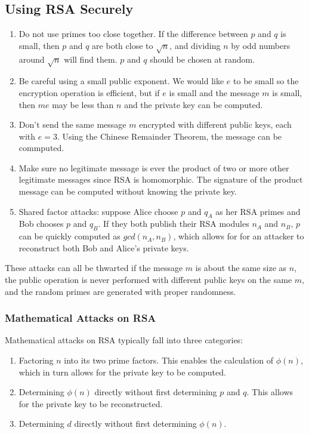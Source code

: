 \documentclass{math}
\begin{document}
\subsection*{Using RSA Securely}
\begin{enumerate}
  \item Do not use primes too close together. If the difference between \( p \)
  and \( q \) is small, then \( p \) and \( q \) are both close to
  \( \sqrt{n} \), and dividing \( n \) by odd numbers around \( \sqrt{n} \) will
  find them. \( p \) and \( q \) should be chosen at random.
  \item Be careful using a small public exponent. We would like \( e \) to be
  small so the encryption operation is efficient, but if \( e \) is small and
  the message \( m \) is small, then \( me \) may be less than \( n \) and
  the private key can be computed.
  \item Don't send the same message \( m \) encrypted with different public
  keys, each with \( e = 3 \). Using the Chinese Remainder Theorem, the
  message can be commputed.
  \item Make sure no legitimate message is ever the product of two or more
  other legitimate messages since RSA is homomorphic. The signature of the
  product message can be computed without knowing the private key.
  \item Shared factor attacks: suppose Alice choose \( p \) and \( q_A \) as
  her RSA primes and Bob chooses \( p \) and \( q_B \). If they both publish
  their RSA modules \( n_A \) and \( n_B \), \( p \) can be quickly computed
  as \( gcd(n_A, n_B) \), which allows for for an attacker to reconstruct
  both Bob and Alice's private keys.
\end{enumerate}
These attacks can all be thwarted if the message \( m \) is about the same
size as \( n \), the public operation is never performed with different public
keys on the same \( m \), and the random primes are generated with proper
randomness.

\subsubsection*{Mathematical Attacks on RSA}
Mathematical attacks on RSA typically fall into three categories:
\begin{enumerate}
  \item Factoring \( n \) into its two prime factors. This enables the
  calculation of \( \phi(n) \), which in turn allows for the private key to be
  computed.
  \item Determining \( \phi(n) \) directly without first determining \( p \) and
  \( q \). This allows for the private key to be reconstructed.
  \item Determining \( d \) directly without first determining \( \phi(n) \).
\end{enumerate}
\end{document}
